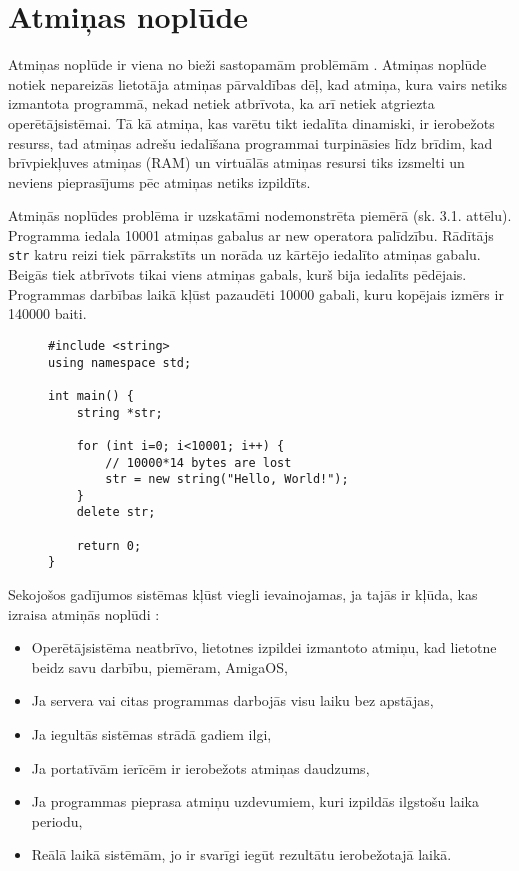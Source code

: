 ﻿\section{Atmiņas noplūde}


Atmiņas noplūde ir viena no bieži sastopamām problēmām \cite{atparv}.
Atmiņas noplūde notiek nepareizās lietotāja atmiņas pārvaldības dēļ, kad atmiņa, kura vairs netiks izmantota programmā,  nekad netiek atbrīvota, ka arī netiek atgriezta operētājsistēmai. 
Tā kā atmiņa, kas varētu tikt iedalīta dinamiski, ir ierobežots resurss, tad atmiņas adrešu iedalīšana programmai turpināsies līdz brīdim, kad  brīvpiekļuves atmiņas (RAM) un virtuālās atmiņas resursi tiks izsmelti un neviens pieprasījums pēc atmiņas netiks izpildīts.


Atmiņās noplūdes problēma ir uzskatāmi nodemonstrēta piemērā (sk. 3.1. attēlu).
Programma  iedala 10001 atmiņas gabalus ar new operatora palīdzību. 
Rādītājs \texttt{str} katru reizi tiek pārrakstīts un norāda uz kārtējo iedalīto atmiņas gabalu.
Beigās tiek atbrīvots tikai viens atmiņas gabals, kurš bija iedalīts pēdējais. 
Programmas darbības laikā kļūst pazaudēti 10000 gabali, kuru kopējais izmērs ir 140000 baiti.
 
\begin{figure}[h]
\begin{lstlisting}
#include <string>
using namespace std;

int main() {
    string *str;

    for (int i=0; i<10001; i++) {
        // 10000*14 bytes are lost
        str = new string("Hello, World!");
    }
    delete str;

    return 0;
}
\end{lstlisting}
\caption{\textbf{\fontsize{11}{12}\selectfont {Atmiņas noplūde, C++}}}
\end{figure}

Sekojošos gadījumos sistēmas kļūst viegli ievainojamas, ja tajās ir kļūda, kas izraisa atmiņās noplūdi \cite{RTTV}: 
\begin{itemize}
\item { Operētājsistēma neatbrīvo, lietotnes izpildei izmantoto atmiņu, kad lietotne beidz savu darbību, piemēram, AmigaOS,}
\item { Ja servera vai citas programmas darbojās visu laiku bez apstājas, }
\item { Ja iegultās sistēmas strādā gadiem ilgi, }
\item { Ja portatīvām ierīcēm ir ierobežots atmiņas daudzums, }
\item { Ja programmas pieprasa atmiņu uzdevumiem, kuri izpildās ilgstošu laika periodu, }
\item { Reālā laikā sistēmām, jo ir svarīgi iegūt rezultātu ierobežotajā laikā. }
\end{itemize}

